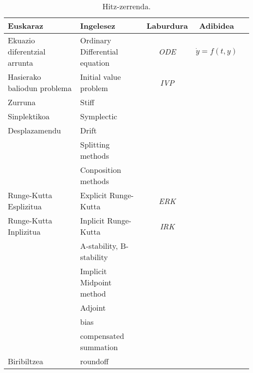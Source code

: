 \begin{table}
\caption{Hitz-zerrenda.}
\label{tab:21}       %
\begin{tabular}{ l l c c c } 
 \hline
 Euskaraz                                &  Ingelesez                           & Laburdura    & Adibidea \\
 \hline
 Ekuazio diferentzial arrunta            &  Ordinary Differential equation      & \emph{ODE}   & $\dot{y}=f(t,y)$ \\
 Hasierako baliodun problema             &  Initial value problem               & \emph{IVP}   &                  \\
 Zurruna								 &  Stiff                               &              &                  \\
 Sinplektikoa                            &  Symplectic                          &              &                  \\
 Desplazamendu                           &  Drift                               &              &                  \\
                                         &  Splitting methods                   &              &                  \\
                                         &  Conposition methods                 &              &                  \\
 Runge-Kutta Esplizitua                  &  Explicit Runge-Kutta                &  \emph{ERK}  &                  \\
 Runge-Kutta Inplizitua                  &  Inplicit Runge-Kutta                &  \emph{IRK}  &                  \\
                                         &  A-stability, B-stability            &              &                  \\
                                         &  Implicit Midpoint method            &              &                  \\
                                         &  Adjoint                             &              &                  \\
                                         &  bias                                &              &                  \\
                                         &  compensated summation               &              &                  \\
 Biribiltzea                             &  roundoff                            &              &                  \\

\end{tabular}
\end{table}
